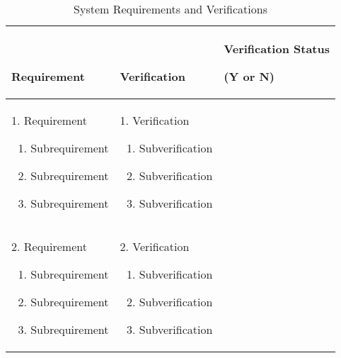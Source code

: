 \vspace{1cm}
\begin{table}[H]
    \centering
    \caption*{\large System Requirements and Verifications}
    \renewcommand{\arraystretch}{1.5}
    \renewcommand\theenumi{\alph{enumi}}
    \begin{tabularx}{\textwidth}{|*{2}{@{\quad}X|}>{\centering\arraybackslash}p{2cm}|}
        \hline
        {~\par Requirement} & {~\par Verification} & Verification Status\par(Y or N) \\ \hline
        
        { %
            1. Requirement
            \begin{enumerate}
                \item Subrequirement
                \item Subrequirement
                \item Subrequirement
            \end{enumerate}
        }& 
        { %
            1. Verification
            \begin{enumerate}
                \item Subverification
                \item Subverification
                \item Subverification
            \end{enumerate}
        }&  \\ \hline
        { %
            2. Requirement
            \begin{enumerate}
                \item Subrequirement
                \item Subrequirement
                \item Subrequirement
            \end{enumerate}
        }& 
        { %
            2. Verification
            \begin{enumerate}
                \item Subverification
                \item Subverification
                \item Subverification

\end{enumerate}}
\end{tabularx}
\end{table}
